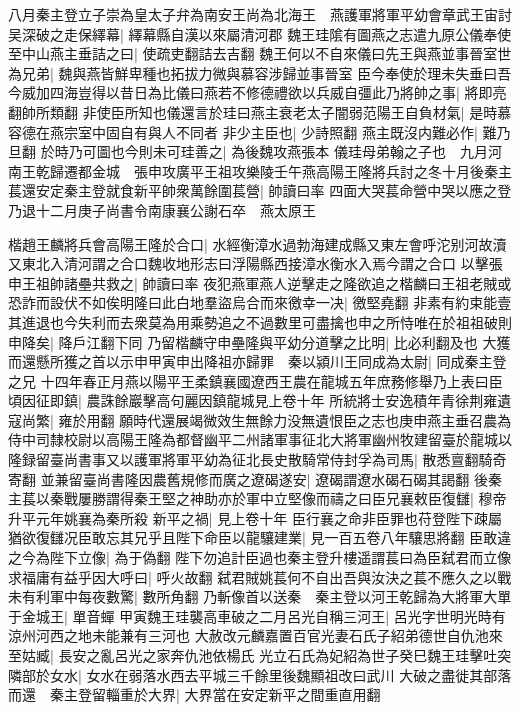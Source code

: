 八月秦主登立子崇為皇太子弁為南安王尚為北海王　燕護軍將軍平幼會章武王宙討吴深破之走保繹幕|{
	繹幕縣自漢以來屬清河郡}
魏王珪隂有圖燕之志遣九原公儀奉使至中山燕主垂詰之曰|{
	使疏吏翻詰去吉翻}
魏王何以不自來儀曰先王與燕並事晉室世為兄弟|{
	魏與燕皆鮮卑種也拓拔力微與慕容涉歸並事晉室}
臣今奉使於理未失垂曰吾今威加四海豈得以昔日為比儀曰燕若不修德禮欲以兵威自彊此乃將帥之事|{
	將即亮翻帥所類翻}
非使臣所知也儀還言於珪曰燕主衰老太子闇弱范陽王自負材氣|{
	是時慕容德在燕宗室中固自有與人不同者}
非少主臣也|{
	少詩照翻}
燕主既沒内難必作|{
	難乃旦翻}
於時乃可圖也今則未可珪善之|{
	為後魏攻燕張本}
儀珪母弟翰之子也　九月河南王乾歸遷都金城　張申攻廣平王祖攻樂陵壬午燕高陽王隆將兵討之冬十月後秦主萇還安定秦主登就食新平帥衆萬餘圍萇營|{
	帥讀曰率}
四面大哭萇命營中哭以應之登乃退十二月庚子尚書令南康襄公謝石卒　燕太原王

楷趙王麟將兵會高陽王隆於合口|{
	水經衡漳水過勃海建成縣又東左會呼沱别河故瀆又東北入清河謂之合口魏收地形志曰浮陽縣西接漳水衡水入焉今謂之合口}
以擊張申王祖帥諸壘共救之|{
	帥讀曰率}
夜犯燕軍燕人逆擊走之隆欲追之楷麟曰王祖老賊或恐詐而設伏不如俟明隆曰此白地羣盜烏合而來徼幸一决|{
	徼堅堯翻}
非素有約束能壹其進退也今失利而去衆莫為用乘勢追之不過數里可盡擒也申之所恃唯在於祖祖破則申降矣|{
	降戶江翻下同}
乃留楷麟守申壘隆與平幼分道擊之比明|{
	比必利翻及也}
大獲而還懸所獲之首以示申甲寅申出降祖亦歸罪　秦以潁川王同成為太尉|{
	同成秦主登之兄}
十四年春正月燕以陽平王柔鎮襄國遼西王農在龍城五年庶務修舉乃上表曰臣頃因征即鎮|{
	農誅餘巖擊高句麗因鎮龍城見上卷十年}
所統將士安逸積年青徐荆雍遺寇尚繁|{
	雍於用翻}
願時代還展竭微效生無餘力没無遺恨臣之志也庚申燕主垂召農為侍中司隸校尉以高陽王隆為都督幽平二州諸軍事征北大將軍幽州牧建留臺於龍城以隆録留臺尚書事又以護軍將軍平幼為征北長史散騎常侍封孚為司馬|{
	散悉亶翻騎奇寄翻}
並兼留臺尚書隆因農舊規修而廣之遼碣遂安|{
	遼碣謂遼水碣石碣其謁翻}
後秦主萇以秦戰屢勝謂得秦王堅之神助亦於軍中立堅像而禱之曰臣兄襄敕臣復讎|{
	穆帝升平元年姚襄為秦所殺}
新平之禍|{
	見上卷十年}
臣行襄之命非臣罪也苻登陛下疎屬猶欲復讎况臣敢忘其兄乎且陛下命臣以龍驤建業|{
	見一百五卷八年驤思將翻}
臣敢違之今為陛下立像|{
	為于偽翻}
陛下勿追計臣過也秦主登升樓遥謂萇曰為臣弑君而立像求福庸有益乎因大呼曰|{
	呼火故翻}
弑君賊姚萇何不自出吾與汝決之萇不應久之以戰未有利軍中每夜數驚|{
	數所角翻}
乃斬像首以送秦　秦主登以河王乾歸為大將軍大單于金城王|{
	單音蟬}
甲寅魏王珪襲高車破之二月呂光自稱三河王|{
	呂光字世明光時有涼州河西之地未能兼有三河也}
大赦改元麟嘉置百官光妻石氏子紹弟德世自仇池來至姑臧|{
	長安之亂呂光之家奔仇池依楊氏}
光立石氏為妃紹為世子癸巳魏王珪擊吐突隣部於女水|{
	女水在弱落水西去平城三千餘里後魏顯祖改曰武川}
大破之盡徙其部落而還　秦主登留輜重於大界|{
	大界當在安定新平之間重直用翻}
